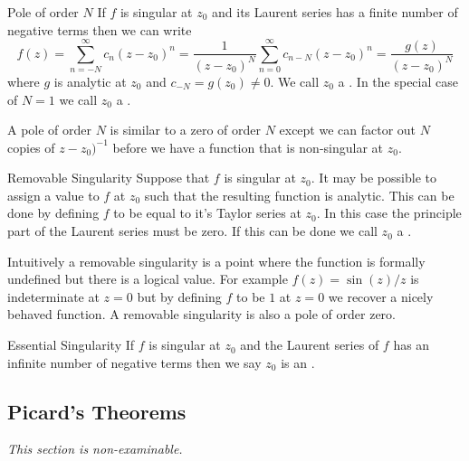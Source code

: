 \documentclass{article}
\begin{document}
    \begin{definition}{Pole of order \(N\)}{}
        If \(f\) is singular at \(z_0\) and its Laurent series has a finite number of negative terms then we can write
        \[f(z) = \sum_{n=-N}^{\infty} c_n(z - z_0)^n = \frac{1}{(z - z_0)^N} \sum_{n=0}^{\infty} c_{n-N}(z - z_0)^n = \frac{g(z)}{(z - z_0)^N}\]
        where \(g\) is analytic at \(z_0\) and \(c_{-N} = g(z_0) \ne 0\).
        We call \(z_0\) a .
        In the special case of \(N = 1\) we call \(z_0\) a .
    \end{definition}
    A pole of order \(N\) is similar to a zero of order \(N\) except we can factor out \(N\) copies of \(z - z_0)^{-1}\) before we have a function that is non-singular at \(z_0\).
    
    \begin{definition}{Removable Singularity}{}
        Suppose that \(f\) is singular at \(z_0\).
        It may be possible to assign a value to \(f\) at \(z_0\) such that the resulting function is analytic.
        This can be done by defining \(f\) to be equal to it's Taylor series at \(z_0\).
        In this case the principle part of the Laurent series must be zero.
        If this can be done we call \(z_0\) a .
    \end{definition}
    Intuitively a removable singularity is a point where the function is formally undefined but there is a logical value.
    For example \(f(z) = \sin(z)/z\) is indeterminate at \(z = 0\) but by defining \(f\) to be \(1\) at \(z = 0\) we recover a nicely behaved function.
    A removable singularity is also a pole of order zero.
    
    \begin{definition}{Essential Singularity}{}
        If \(f\) is singular at \(z_0\) and the Laurent series of \(f\) has an infinite number of negative terms then we say \(z_0\) is an .
    \end{definition}
    
    \subsection{Picard's Theorems}
    \emph{This section is non-examinable.}
    
\end{document}
